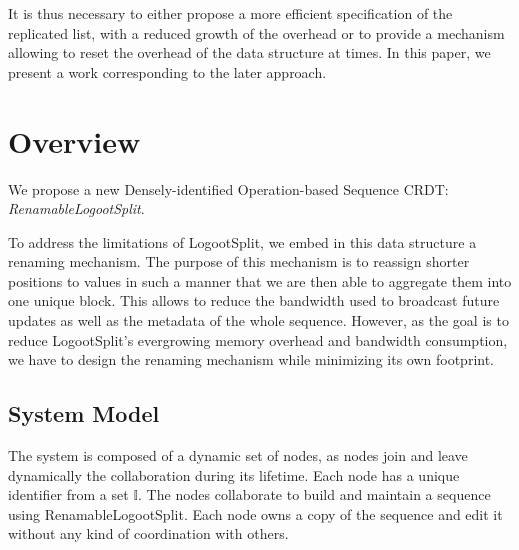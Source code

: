 \documentclass{article}
\theoremstyle{definition}
\newcounter{note-counter}
\theoremstyle{definition}
\theoremstyle{definition}
\theoremstyle{definition}
\begin{document}



It is thus necessary to either propose a more efficient specification of the replicated list, with a reduced growth of the overhead
or to provide a mechanism allowing to reset the overhead of the data structure at times.
In this paper, we present a work corresponding to the later approach.

\section{Overview}

We propose a new Densely-identified Operation-based Sequence \ac{CRDT}: \emph{RenamableLogootSplit}.

To address the limitations of LogootSplit, we embed in this data structure a renaming mechanism.
The purpose of this mechanism is to reassign shorter positions to values in such a manner that we are then able to aggregate them into one unique block.
This allows to reduce the bandwidth used to broadcast future updates as well as the metadata of the whole sequence.
However, as the goal is to reduce LogootSplit's evergrowing memory overhead and bandwidth consumption, we have to design the renaming mechanism while minimizing its own footprint.

\subsection{System Model}

The system is composed of a dynamic set of nodes, as nodes join and leave dynamically the collaboration during its lifetime.
Each node has a unique identifier from a set $\mathbb{I}$.
The nodes collaborate to build and maintain a sequence using RenamableLogootSplit.
Each node owns a copy of the sequence and edit it without any kind of coordination with others.
\end{document}
